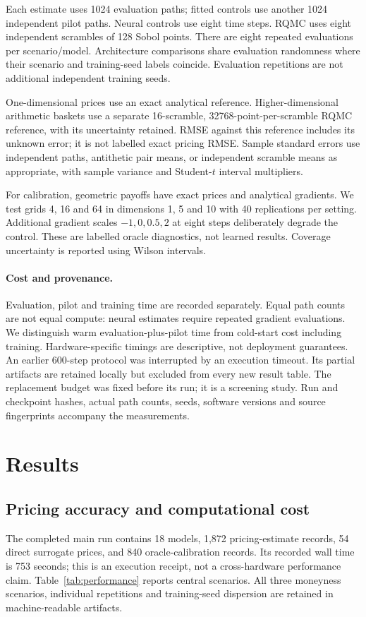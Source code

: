 \documentclass[10pt]{article}
\begin{document}
Each estimate uses 1024 evaluation paths; fitted controls use another 1024
independent pilot paths. Neural controls use eight time steps. RQMC uses eight
independent scrambles of 128 Sobol points. There are eight repeated evaluations
per scenario/model. Architecture comparisons share evaluation randomness where
their scenario and training-seed labels coincide. Evaluation repetitions are not
additional independent training seeds.

One-dimensional prices use an exact analytical reference. Higher-dimensional
arithmetic baskets use a separate 16-scramble, 32768-point-per-scramble RQMC
reference, with its uncertainty retained. RMSE against this reference includes
its unknown error; it is not labelled exact pricing RMSE. Sample standard errors
use independent paths, antithetic pair means, or independent scramble means as
appropriate, with sample variance and Student-$t$ interval multipliers.

For calibration, geometric payoffs have exact prices and analytical gradients.
We test grids 4, 16 and 64 in dimensions 1, 5 and 10 with 40 replications per
setting. Additional gradient scales $-1,0,0.5,2$ at eight steps deliberately
degrade the control. These are labelled oracle diagnostics, not learned results.
Coverage uncertainty is reported using Wilson intervals.

\paragraph{Cost and provenance.}
Evaluation, pilot and training time are recorded separately. Equal path counts
are not equal compute: neural estimates require repeated gradient evaluations.
We distinguish warm evaluation-plus-pilot time from cold-start cost including
training. Hardware-specific timings are descriptive, not deployment guarantees.
An earlier 600-step protocol was interrupted by an execution timeout. Its
partial artifacts are retained locally but excluded from every new result table.
The replacement budget was fixed before its run; it is a screening study.
Run and checkpoint hashes, actual path counts, seeds, software versions and
source fingerprints accompany the measurements.

\section{Results}
\subsection{Pricing accuracy and computational cost}
The completed main run contains 18 models, 1,872 pricing-estimate records,
54 direct surrogate prices, and 840 oracle-calibration records. Its recorded
wall time is 753 seconds; this is an execution receipt, not a cross-hardware
performance claim. Table~\ref{tab:performance} reports central scenarios.
All three moneyness scenarios, individual repetitions and training-seed
dispersion are retained in machine-readable artifacts.
\end{document}
